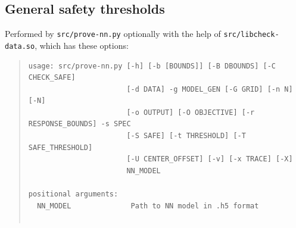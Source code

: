 \documentclass[a4paper,parskip=half]{article} %
\newcommand*\cmdstyle\texttt
\newcommand*\cmd[1]{\cmdstyle{\textcolor{red!85!black}{#1}}}
\newenvironment{cmdhelp}{\begin{quote}\footnotesize}{\end{quote}}
\newcommand*\provenn{prove-nn.py}
\begin{document}
\subsection{General safety thresholds}\label{sec:nn_model2.py}
Performed by \cmd{src/\provenn} optionally with the help of
\cmd{src/libcheck-data.so}, which has these options:
\begin{cmdhelp}\begin{verbatim}
usage: src/prove-nn.py [-h] [-b [BOUNDS]] [-B DBOUNDS] [-C CHECK_SAFE]
                       [-d DATA] -g MODEL_GEN [-G GRID] [-n N] [-N]
                       [-o OUTPUT] [-O OBJECTIVE] [-r RESPONSE_BOUNDS] -s SPEC
                       [-S SAFE] [-t THRESHOLD] [-T SAFE_THRESHOLD]
                       [-U CENTER_OFFSET] [-v] [-x TRACE] [-X]
                       NN_MODEL

positional arguments:
  NN_MODEL              Path to NN model in .h5 format


\end{verbatim}
\end{cmdhelp}
\end{document}
